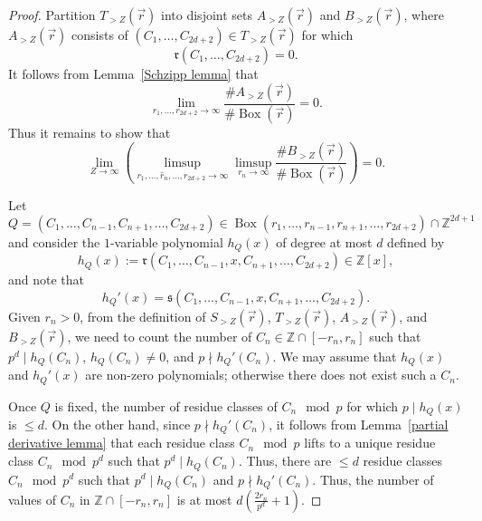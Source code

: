 \documentclass[12pt]{amsart}
\newcommand{\Z}{\mathbb{Z}}
\newcommand{\op}[1]{\operatorname{#1}}
\numberwithin{equation}{section}
\begin{document}
\begin{proof}
    \par Partition $T_{>Z}(\vec{r})$ into disjoint sets $A_{>Z}(\vec{r})$ and $B_{>Z}(\vec{r})$, where $A_{>Z}(\vec{r})$ consists of $(C_1, \dots, C_{2d+2})\in T_{>Z}(\vec{r})$ for which 
    \[\mathfrak{r}(C_1, \dots, C_{2d+2})=0.\] It follows from Lemma~\ref{Schzipp lemma} that 
    \[\lim_{r_1, \dots, r_{2d+2}\rightarrow \infty} \frac{\#A_{>Z}(\vec{r}) }{\# \op{Box}(\vec{r})}=0.\]
   Thus it remains to show that 
    \[\lim_{Z\rightarrow \infty}\left(\limsup_{r_1, \dots, \hat{r}_n, \dots, r_{2d+2}\rightarrow\infty} \limsup_{r_{n}\rightarrow \infty}  \frac{\#B_{>Z}(\vec{r}) }{\# \op{Box}(\vec{r})}\right)=0.\]
    
    Let \[Q=(C_1, \dots, C_{n-1}, C_{n+1}, \dots, C_{2d+2})\in \op{Box}(r_1, \dots, r_{n-1}, r_{n+1}, \dots, r_{2d+2})\cap \Z^{2d+1}\] and consider the $1$-variable polynomial $h_Q(x)$ of
    degree at most $d$ defined by 
    \[h_Q(x):=\mathfrak{r}(C_1, \dots, C_{n-1}, x, C_{n+1}, \dots , C_{2d+2})\in \Z[x],\] and note that 
    \[h_Q'(x)=\mathfrak{s}(C_1, \dots, C_{n-1}, x, C_{n+1}, \dots , C_{2d+2}).\]  Given $r_{n}>0$, 
    from the definition of $S_{>Z}(\vec{r})$, $T_{>Z}(\vec{r})$, $A_{>Z}(\vec{r})$, and 
    $B_{>Z}(\vec{r})$, 
    we need to count the number of $C_n\in \Z\cap [-r_{n}, r_{n}]$ such that $p^d\mid h_Q(C_n)$, $h_Q(C_n)\neq 0$, and $p\nmid h_Q'(C_n)$. We may assume that $h_Q(x)$ and $h_Q'(x)$ are non-zero polynomials; otherwise there does not exist such a $C_n$. 
    
    Once $Q$ is fixed, the number of residue classes of $C_n\mod{p}$ for which $p\mid h_Q(x)$ is $\leq d$. On the other hand, since $p\nmid h_Q'(C_n)$, it follows from Lemma~\ref{partial derivative lemma} that each residue class $C_n\mod{p}$ lifts to a unique residue class $C_n\mod{p^d}$ such that $p^d\mid h_Q(C_n)$. Thus, there are $\leq d$ residue classes $C_n\mod{p^d}$ such that $p^d\mid h_Q(C_n)$ and $p\nmid h_Q'(C_n)$. Thus, the number of values of $C_n$ in $\Z\cap [-r_{n}, r_{n}]$ is at most $\displaystyle d\left(\frac{2r_{n}}{p^d}+1\right)$. 
    

\end{proof}
\end{document}
